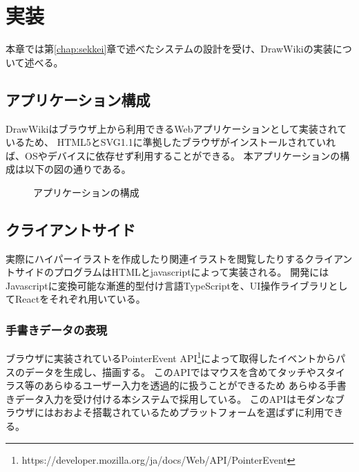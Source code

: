 \chapter{実装}
\label{chap:jissou}

本章では第\ref{chap:sekkei}章で述べたシステムの設計を受け、DrawWikiの実装について述べる。

\newpage

\section{アプリケーション構成}
DrawWikiはブラウザ上から利用できるWebアプリケーションとして実装されているため、
HTML5とSVG1.1に準拠したブラウザがインストールされていれば、OSやデバイスに依存せず利用することができる。
本アプリケーションの構成は以下の図の通りである。

\begin{figure}[htbp]
    \begin{center}
         \end{center}
    \caption{アプリケーションの構成}
\end{figure}

\section{クライアントサイド}
実際にハイパーイラストを作成したり関連イラストを閲覧したりするクライアントサイドのプログラムはHTMLとjavascriptによって実装される。
開発にはJavascriptに変換可能な漸進的型付け言語TypeScriptを、UI操作ライブラリとしてReactをそれぞれ用いている。

\subsection{手書きデータの表現}
ブラウザに実装されているPointerEvent API\footnote{https://developer.mozilla.org/ja/docs/Web/API/PointerEvent}によって取得したイベントからパスのデータを生成し、描画する。
このAPIではマウスを含めてタッチやスタイラス等のあらゆるユーザー入力を透過的に扱うことができるため
あらゆる手書きデータ入力を受け付ける本システムで採用している。
このAPIはモダンなブラウザにはおおよそ搭載されているためプラットフォームを選ばずに利用できる。

